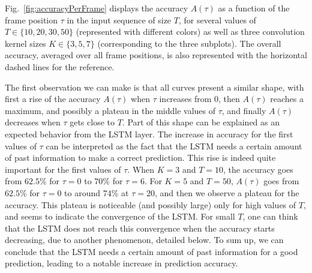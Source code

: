 Fig.~\ref{fig:accuracyPerFrame} displays the accuracy $A(\tau)$ as a function of the frame position $\tau$ in the input sequence of size $T$, for several values of $T \in \{10,20,30,50\}$ (represented with different colors) as well as three convolution kernel sizes $K \in \{3,5,7\}$ (corresponding to the three subplots). The overall accuracy, averaged over all frame positions, is also represented with the horizontal dashed lines for the reference.

The first observation we can make is that all curves present a similar shape, with first a rise of the accuracy $A(\tau)$ when $\tau$ increases from $0$, then $A(\tau)$ reaches a maximum, and possibly a plateau in the middle values of $\tau$, and finally $A(\tau)$ decreases when $\tau$ gets close to $T$. Part of this shape can be explained as an expected behavior from the LSTM layer. The increase in accuracy for the first values of $\tau$ can be interpreted as the fact that the LSTM needs a certain amount of past information to make a correct prediction. This rise is indeed quite important for the first values of $\tau$. When $K=3$ and $T=10$, the accuracy goes from $62.5$\% for $\tau=0$ to $70$\% for $\tau=6$. For $K=5$ and $T=50$, $A(\tau)$ goes from $62.5$\% for $\tau=0$ to around $74$\% at $\tau=20$, and then we observe a plateau for the accuracy. This plateau is noticeable (and possibly large) only for high values of $T$, and seems to indicate the convergence of the LSTM. For small $T$, one can think that the LSTM does not reach this convergence when the accuracy starts decreasing, due to another phenomenon, detailed below. To sum up, we can conclude that the LSTM needs a certain amount of past information for a good prediction, leading to a notable increase in prediction accuracy.

